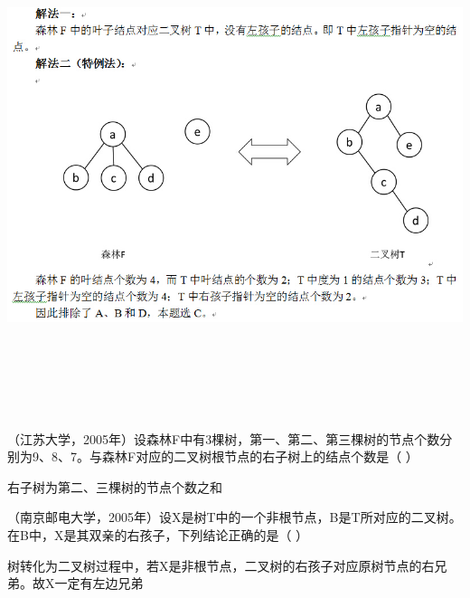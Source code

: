 \begin{solution}\includegraphics[width=8.31250in,height=5.72917in]{computerassets/8e82dd8ce320967b382ec04f01be2a5d.jpeg}
\end{solution}
\question （江苏大学，2005年）设森林F中有3棵树，第一、第二、第三棵树的节点个数分别为9、8、7。与森林F对应的二叉树根节点的右子树上的结点个数是（
）
\par{}
\begin{solution}右子树为第二、三棵树的节点个数之和
\end{solution}
\question （南京邮电大学，2005年）设X是树T中的一个非根节点，B是T所对应的二叉树。在B中，X是其双亲的右孩子，下列结论正确的是（
）
\par{}
\begin{solution}树转化为二叉树过程中，若X是非根节点，二叉树的右孩子对应原树节点的右兄弟。故X一定有左边兄弟
\end{solution}
